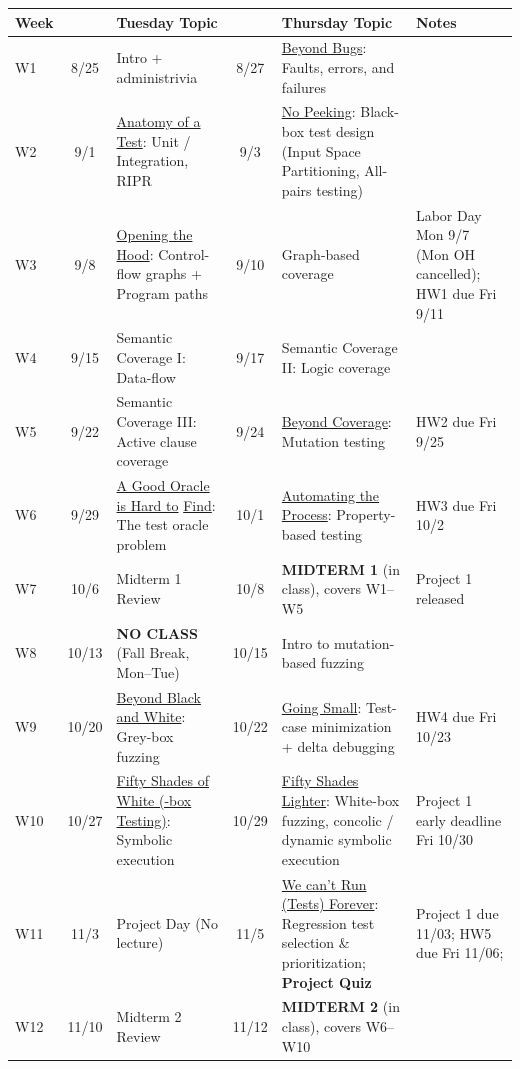 \documentclass[letterpaper,11pt]{article}
\begin{document}
{   \small
\begin{tabular}{l|cp{}|cp{}|p{}}
  \textbf{Week}
  & & \textbf{Tuesday Topic}
  & & \textbf{Thursday Topic}
  & \textbf{Notes} \\ \hline\hline
  W1
  & 8/25 & Intro + administrivia
  & 8/27 & \underline{Beyond Bugs}: Faults, errors, and failures
  & \\ \hline
  W2
  & 9/1 & \underline{Anatomy of a Test}: Unit / Integration, RIPR
  & 9/3 & \underline{No Peeking}: Black-box test design (Input Space Partitioning, All-pairs testing)
  & \\ \hline
  W3
  & 9/8 & \underline{Opening the Hood}: Control-flow graphs + Program paths
  & 9/10 & Graph-based coverage
  & Labor Day Mon 9/7 (Mon OH cancelled); HW1 due Fri 9/11 \\ \hline
  W4
  & 9/15 & Semantic Coverage I: Data-flow
  & 9/17 & Semantic Coverage II: Logic coverage
  & \\ \hline
  W5
  & 9/22 & Semantic Coverage III: Active clause coverage
  & 9/24 & \underline{Beyond Coverage}: Mutation testing
  & HW2 due Fri 9/25 \\ \hline
  W6
  & 9/29 & \underline{A Good Oracle is Hard to} \underline{Find}: The test oracle problem
  & 10/1 & \underline{Automating the Process}: Property-based testing
  & HW3 due Fri 10/2 \\ \hline
  W7
  & 10/6 & Midterm 1 Review
  & 10/8 & \textbf{MIDTERM 1} (in class), covers W1--W5
  & Project 1 released \\ \hline
  W8
  & 10/13 & \textbf{NO CLASS} (Fall Break, Mon--Tue)
  & 10/15 & Intro to mutation-based fuzzing
  & \\ \hline
  W9
  & 10/20 & \underline{Beyond Black and White}: Grey-box fuzzing
  & 10/22 & \underline{Going Small}: Test-case minimization + delta debugging
  & HW4 due Fri 10/23 \\ \hline
  W10
  & 10/27 & \underline{Fifty Shades of White (-box} \underline{Testing)}: Symbolic execution
  & 10/29 & \underline{Fifty Shades Lighter}: White-box fuzzing, concolic / dynamic symbolic execution
  &  Project 1 early deadline Fri 10/30 \\ \hline
  W11
  & 11/3 & Project Day (No lecture)
  & 11/5 & \underline{We can't Run (Tests) Forever}: Regression test
           selection \& prioritization; \textbf{Project Quiz}
  &  Project 1 due 11/03; HW5 due Fri 11/06; \\ \hline
  W12
  & 11/10 & Midterm 2 Review
  & 11/12 & \textbf{MIDTERM 2} (in class), covers W6--W10

\end{tabular}}
\end{document}
